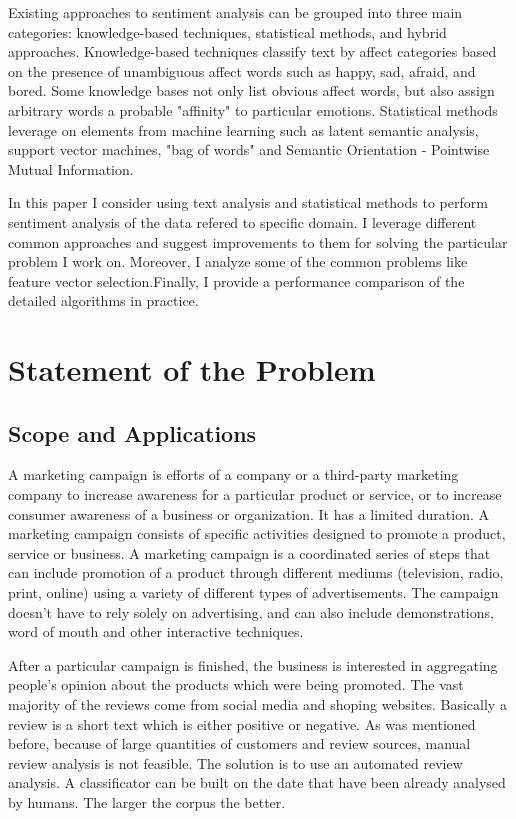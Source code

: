 \documentclass[12pt]{report}
\begin{document}
Existing approaches to sentiment analysis can be grouped into three main categories: knowledge-based techniques, statistical methods, and hybrid approaches. Knowledge-based techniques classify text by affect categories based on the presence of unambiguous affect words such as happy, sad, afraid, and bored. Some knowledge bases not only list obvious affect words, but also assign arbitrary words a probable "affinity" to particular emotions. Statistical methods leverage on elements from machine learning such as latent semantic analysis, support vector machines, "bag of words" and Semantic Orientation - Pointwise Mutual Information.

In this paper I consider using text analysis and statistical methods to perform sentiment analysis of the data refered to specific domain. I leverage different common approaches and suggest improvements to them for solving the particular problem I work on. Moreover, I analyze some of the common problems like feature vector selection.Finally, I provide a performance comparison of the detailed algorithms in practice.

\newpage


\chapter{Statement of the Problem}

\section{Scope and Applications}

A marketing campaign is efforts of a company or a third-party marketing company to increase awareness for a particular product or service, or to increase consumer awareness of a business or organization. It has a limited duration. A marketing campaign consists of specific activities designed to promote a product, service or business. A marketing campaign is a coordinated series of steps that can include promotion of a product through different mediums (television, radio, print, online) using a variety of different types of advertisements. The campaign doesn't have to rely solely on advertising, and can also include demonstrations, word of mouth and other interactive techniques.

After a particular campaign is finished, the business is interested in aggregating people's opinion about the products which were being promoted. The vast majority of the reviews come from social media and shoping websites. Basically a review is a short text which is either positive or negative. As was mentioned before, because of large quantities of customers and review sources, manual review analysis is not feasible. The solution is to use an automated review analysis. A classificator can be built on the date that have been already analysed by humans. The larger the corpus the better.
\end{document}
